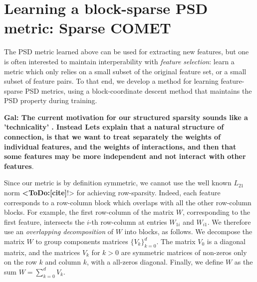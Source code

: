 \documentclass[twoside,11pt]{article}
\newcommand\todo[1]{\textbf{<ToDo:#1}!>}
\newcommand\mat[1]{{#1}}
\newcommand{\W}{\mat{W}}
\newcommand{\Vk}{\mat{V_k}}
\newcommand{\Vz}{\mat{V_0}}
\newcommand{\Vg}{\{\Vk\}_{k=0}^{d}} %
\begin{document}
\section{Learning a block-sparse PSD metric: Sparse COMET}
The PSD metric learned above can be used for extracting new features, but one is often interested to maintain interperability with \emph{feature selection}: learn a metric which only relies on a small subset of the original feature set, or a small subset of feature pairs. To that end, we develop a method for learning feature-sparse PSD metrics, using a block-coordinate descent method that maintains the PSD property during  training.


{\bf Gal: The current motivation  for our structured sparsity sounds like a 'technicality' . Instead Lets explain that a natural structure of connection, is that we want to treat separately the weights of individual features, and the weights of interactions, and then that some features may be more independent and not interact with other features}. 

Since our metric is by definition symmetric, we cannot use the well known $L_{21}$ norm \todo{[cite]} for achieving row-sparsity. Indeed, each feature corresponds to a row-column block which overlaps with all the other row-column blocks. For example, the first row-column of the matrix $\W$, corresponding to the first feature, intersects the $i$-th row-column at entries $W_{1i}$ and $W_{i1}$. We therefore use an \emph{overlapping decomposition} \citep{jacob2009group,obozinski2011group} of $W$ into blocks, as follows. 
We decompose the matrix $\W$ to group components matrices $\Vg$. The matrix $V_0$ is a diagonal matrix, and the matrices $V_k$ for $k>0$ are symmetric matrices of non-zeros only on the row $k$ and column $k$, with a all-zeros diagonal. Finally, we define $\W$ as the sum $\W = \sum_{k=0}^{d}{\Vk}$.


\end{document}
